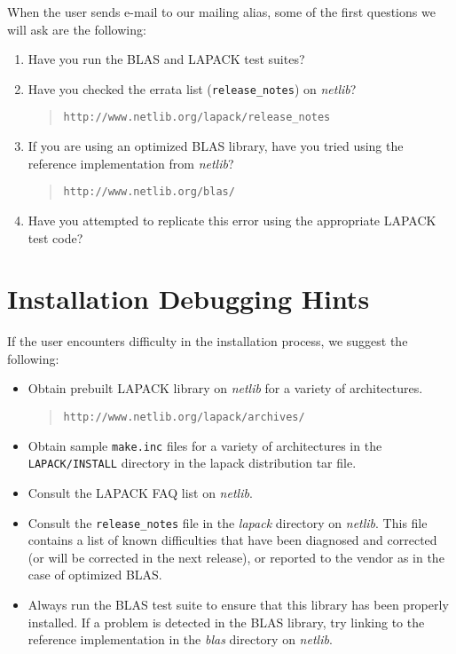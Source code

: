 When the user sends e-mail to our mailing alias, some of the first questions
we will ask are the following:
\begin{enumerate}
\item Have you run the BLAS and LAPACK test suites?
\item Have you checked the errata list ({\tt release\_notes}) on {\em netlib}?
\begin{quote}
{\tt http://www.netlib.org/lapack/release\_notes}
\end{quote}
 
\item If you are using an optimized BLAS library, have you
tried using the reference implementation from {\em netlib}?
 \begin{quote}
 {\tt http://www.netlib.org/blas/}
 \end{quote}
\item Have you attempted to replicate this error using the appropriate
LAPACK test code?
\end{enumerate}
 
\section{Installation Debugging Hints}
 
If the user encounters difficulty in the installation process, we
suggest the following:
\begin{itemize}
 \item Obtain prebuilt LAPACK library on {\em netlib}
       for a variety of architectures.
       \begin{quote}
       {\tt http://www.netlib.org/lapack/archives/}
       \end{quote}
 \item Obtain sample {\tt make.inc} files for a variety of architectures
       in the {\tt LAPACK/INSTALL} directory in the lapack
       distribution tar file.
 \item Consult the LAPACK FAQ list on {\em netlib}.
 \item Consult the {\tt release\_notes} file in the {\em lapack} directory
       on {\em netlib}.  This file contains a list of known difficulties
       that have been diagnosed and corrected (or will be
       corrected in the next release), or reported to the vendor as in the case
       of optimized BLAS.
 \item Always run the BLAS test suite to ensure that
       this library has been properly installed.  If a problem
       is detected in the BLAS library, try linking to the reference
       implementation in the {\em blas} directory on {\em netlib}.
\end{itemize}
 

